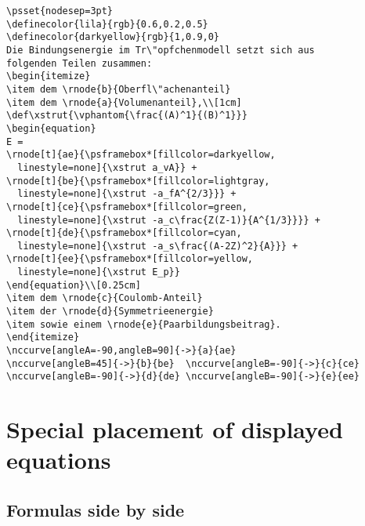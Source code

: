 \begin{table}[htb]
\medskip
\begin{lstlisting}[tabsize=4]
\psset{nodesep=3pt}
\definecolor{lila}{rgb}{0.6,0.2,0.5}
\definecolor{darkyellow}{rgb}{1,0.9,0}
Die Bindungsenergie im Tr\"opfchenmodell setzt sich aus
folgenden Teilen zusammen:
\begin{itemize}
\item dem \rnode{b}{Oberfl\"achenanteil}
\item dem \rnode{a}{Volumenanteil},\\[1cm]
\def\xstrut{\vphantom{\frac{(A)^1}{(B)^1}}}
\begin{equation}
E =
\rnode[t]{ae}{\psframebox*[fillcolor=darkyellow,
  linestyle=none]{\xstrut a_vA}} +
\rnode[t]{be}{\psframebox*[fillcolor=lightgray,
  linestyle=none]{\xstrut -a_fA^{2/3}}} +
\rnode[t]{ce}{\psframebox*[fillcolor=green,
  linestyle=none]{\xstrut -a_c\frac{Z(Z-1)}{A^{1/3}}}} +
\rnode[t]{de}{\psframebox*[fillcolor=cyan,
  linestyle=none]{\xstrut -a_s\frac{(A-2Z)^2}{A}}} +
\rnode[t]{ee}{\psframebox*[fillcolor=yellow,
  linestyle=none]{\xstrut E_p}}
\end{equation}\\[0.25cm]
\item dem \rnode{c}{Coulomb-Anteil}
\item der \rnode{d}{Symmetrieenergie}
\item sowie einem \rnode{e}{Paarbildungsbeitrag}.
\end{itemize}
\nccurve[angleA=-90,angleB=90]{->}{a}{ae}
\nccurve[angleB=45]{->}{b}{be}  \nccurve[angleB=-90]{->}{c}{ce}
\nccurve[angleB=-90]{->}{d}{de} \nccurve[angleB=-90]{->}{e}{ee}
\end{lstlisting}




\section[Special Placement]{Special placement of displayed equations}

\subsection{Formulas side by side}\label{sec:sidebyside}


\end{table}
